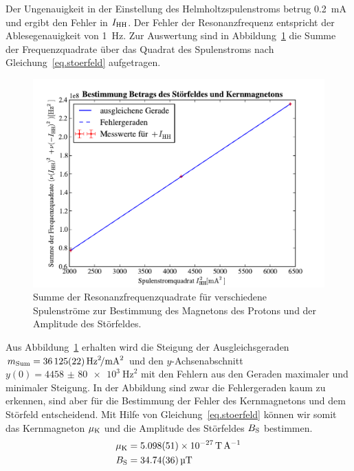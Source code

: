\documentclass[paper=a4,
	fontsize=10pt,
	DIV=18,
	twocolumn,
	parskip=half
	]{scrartcl}
\numberwithin{equation}{section}    %
\begin{document}
Der Ungenauigkeit in der Einstellung des Helmholtzspulenstroms betrug \SI{0.2}{\milli\ampere} und ergibt den Fehler in $I_{\rm HH}$. Der Fehler der Resonanzfrequenz entspricht der Ablesegenauigkeit von \SI{1}{\hertz}.
Zur Auswertung sind in Abbildung~\ref{fig.stoerfeld} die Summe der Frequenzquadrate über das Quadrat des Spulenstroms nach Gleichung~\eqref{eq.stoerfeld} aufgetragen.

\begin{figure}[htp]
	\begin{center}
		\includegraphics[width=\columnwidth]{Data-Plots/10-helmholtz-summe.pdf}
		\caption{Summe der Resonanzfrequenzquadrate für verschiedene Spulenströme zur Bestimmung des Magnetons des Protons und der Amplitude des Störfeldes.}
		\label{fig.stoerfeld}
	\end{center}
\end{figure}

Aus Abbildung~\ref{fig.stoerfeld} erhalten wird die Steigung der Ausgleichsgeraden $m_{\rm Sum} = \SI[per-mode=symbol]{36125(22)}{\hertz\squared\per\milli\ampere\squared} $ und den $y$-Achsenabschnitt $y(0) = \SI{4458(80)e3}{\hertz\squared}$ mit den Fehlern aus den Geraden maximaler und minimaler Steigung. In der Abbildung sind zwar die Fehlergeraden kaum zu erkennen, sind aber für die Bestimmung der Fehler des Kernmagnetons und dem Störfeld entscheidend.
Mit Hilfe von Gleichung~\eqref{eq.stoerfeld} können wir somit das Kernmagneton $\mu_{\rm K}$ und die Amplitude des Störfeldes $B_{\rm S}$ bestimmen.
\begin{align}
	\mu_{\rm K} &= \SI{5.098(51)e-27}{\tesla\per\ampere}\\
	B_{\rm S} &=  \SI{34.74(36)}{\micro\tesla}
\end{align}
\end{document}
